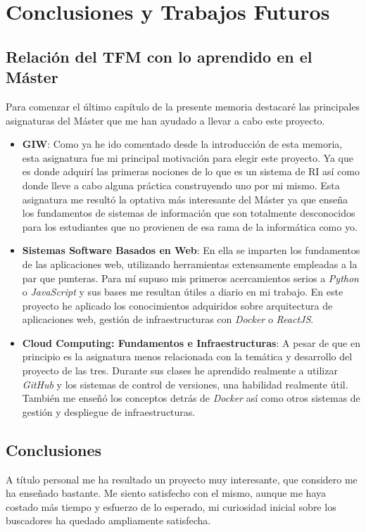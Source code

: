 \chapter{Conclusiones y Trabajos Futuros}

\section{Relación del \acrshort{TFM} con lo aprendido en el Máster}
Para comenzar el último capítulo de la presente memoria destacaré las principales asignaturas del Máster que me han ayudado a llevar a cabo este proyecto.

\begin{itemize}
	\item \textbf{\acrlong{GIW}}: Como ya he ido comentado desde la introducción de esta memoria, esta asignatura fue mi principal motivación para elegir este proyecto. Ya que es donde adquirí las primeras nociones de lo que es un sistema de \acrshort{RI} así como donde lleve a cabo alguna práctica construyendo uno por mi mismo. Esta asignatura me resultó la optativa más interesante del Máster ya que enseña los fundamentos de sistemas de información que son totalmente desconocidos para los estudiantes que no provienen de esa rama de la informática como yo.
	\item \textbf{Sistemas Software Basados en Web}: En ella se imparten los fundamentos de las aplicaciones web, utilizando herramientas extensamente empleadas a la par que punteras. Para mí supuso mis primeros acercamientos serios a \textit{Python} o \textit{JavaScript} y sus bases me resultan útiles a diario en mi trabajo. En este proyecto he aplicado los conocimientos adquiridos sobre arquitectura de aplicaciones web, gestión de infraestructuras con \textit{Docker} o \textit{ReactJS}.
	\item \textbf{Cloud Computing: Fundamentos e Infraestructuras}: A pesar de que en principio es la asignatura menos relacionada con la temática y desarrollo del proyecto de las tres. Durante sus clases he aprendido realmente a utilizar \textit{GitHub} y los sistemas de control de versiones, una habilidad realmente útil. También me enseñó los conceptos detrás de \textit{Docker} así como otros sistemas de gestión y despliegue de infraestructuras.
\end{itemize}

\section{Conclusiones}
A título personal me ha resultado un proyecto muy interesante, que considero me ha enseñado bastante. Me siento satisfecho con el mismo, aunque me haya costado más tiempo y esfuerzo de lo esperado, mi curiosidad inicial sobre los buscadores ha quedado ampliamente satisfecha. 

